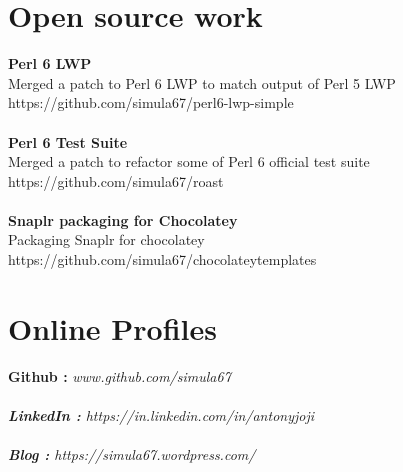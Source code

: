 \documentclass[line,margin]{res}
\begin{document}
\begin{resume}
\section{Open source work}
{\bf Perl 6 LWP}\\
Merged a patch to Perl 6 LWP to match output of Perl 5 LWP\\
https://github.com/simula67/perl6-lwp-simple\\ \\
{\bf Perl 6 Test Suite}\\
Merged a patch to refactor some of Perl 6 official test suite\\
https://github.com/simula67/roast\\ \\
{\bf Snaplr packaging for Chocolatey}\\
Packaging Snaplr for chocolatey\\
https://github.com/simula67/chocolateytemplates\\


\section{Online Profiles}
{\bf Github :} \it{www.github.com/simula67} \\ \\ 
{\bf LinkedIn :} \it{https://in.linkedin.com/in/antonyjoji} \\ \\
{\bf Blog :} \it{https://simula67.wordpress.com/} \\

\end{resume}
\end{document}
